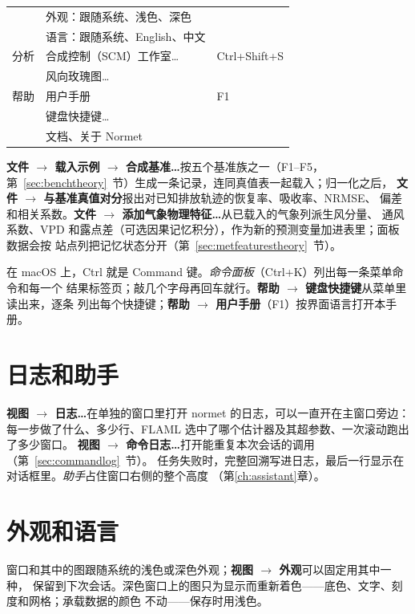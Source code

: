 \documentclass[11pt]{ctexrep}
\newcommand{\nm}{\textsf{normet}}
\newcommand{\tab}[1]{\textbf{#1}}
\begin{document}
\begin{center}
\begin{tabular}{@{}lll@{}}
         & 外观：跟随系统、浅色、深色           & \\
         & 语言：跟随系统、English、中文        & \\
分析     & 合成控制（SCM）工作室…               & Ctrl+Shift+S \\
         & 风向玫瑰图…                          & \\
帮助     & 用户手册                             & F1 \\
         & 键盘快捷键…                          & \\
         & 文档、关于 Normet                    & \\
\bottomrule
\end{tabular}
\end{center}
\tab{文件 $\rightarrow$ 载入示例 $\rightarrow$ 合成基准…}按五个基准族之一（F1--F5，
第~\ref{sec:benchtheory}~节）生成一条记录，连同真值表一起载入；归一化之后，
\tab{文件 $\rightarrow$ 与基准真值对分}报出对已知排放轨迹的恢复率、吸收率、NRMSE、
偏差和相关系数。\tab{文件 $\rightarrow$ 添加气象物理特征…}从已载入的气象列派生风分量、
通风系数、VPD 和露点差（可选因果记忆积分），作为新的预测变量加进表里；面板数据会按
站点列把记忆状态分开（第~\ref{sec:metfeaturestheory}~节）。

在 macOS 上，Ctrl 就是 Command 键。\emph{命令面板}（Ctrl+K）列出每一条菜单命令和每一个
结果标签页；敲几个字母再回车就行。\tab{帮助 $\rightarrow$ 键盘快捷键}从菜单里读出来，逐条
列出每个快捷键；\tab{帮助 $\rightarrow$ 用户手册}（F1）按界面语言打开本手册。

\section{日志和助手}
\tab{视图 $\rightarrow$ 日志…}在单独的窗口里打开 \nm{} 的日志，可以一直开在主窗口旁边：
每一步做了什么、多少行、FLAML 选中了哪个估计器及其超参数、一次滚动跑出了多少窗口。
\tab{视图 $\rightarrow$ 命令日志…}打开能重复本次会话的调用（第~\ref{sec:commandlog}~节）。
任务失败时，完整回溯写进日志，最后一行显示在对话框里。\emph{助手}占住窗口右侧的整个高度
（第\ref{ch:assistant}章）。

\section{外观和语言}\label{sec:appearance}
窗口和其中的图跟随系统的浅色或深色外观；\tab{视图 $\rightarrow$ 外观}可以固定用其中一种，
保留到下次会话。深色窗口上的图只为显示而重新着色——底色、文字、刻度和网格；承载数据的颜色
不动——保存时用浅色。
\end{document}
